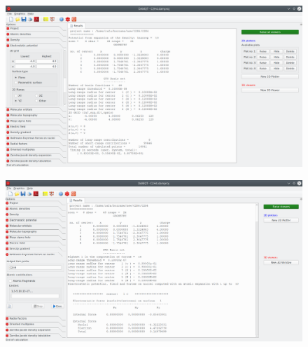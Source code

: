 \documentclass[a4paper,10pt]{article}
\begin{document}
\begin{minipage}{.5\linewidth}
\begin{figure}[H]
\caption{\label{fig:17}}
\begin{center}
\includegraphics[width=0.95\linewidth]{damqt_QS_fig17.png}
\end{center}
\end{figure} 
\end{minipage}
\begin{minipage}{.5\linewidth}
\begin{figure}[H]
\caption{\label{fig:18}}
\begin{center}
\includegraphics[width=0.95\linewidth]{damqt_QS_fig18.png}
\end{center}
\end{figure} 
\end{minipage}
\end{document}
